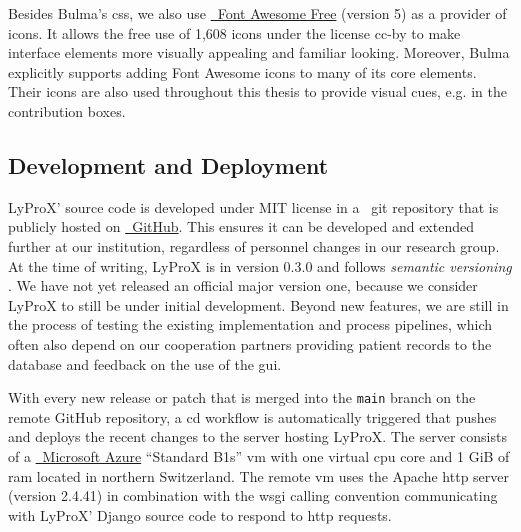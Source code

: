 \documentclass[\relativeRoot/main.tex]{subfiles}
\begin{document}
Besides Bulma's \gls{css}, we also use \href{https://fontawesome.com}{~Font Awesome Free} (version 5) \cite{noauthor_font_2022} as a provider of icons. It allows the free use of 1,608 icons under the license  \gls{cc-by} to make interface elements more visually appealing and familiar looking. Moreover, Bulma explicitly supports adding Font Awesome icons to many of its core elements. Their icons are also used throughout this thesis to provide visual cues, e.g. in the contribution boxes.

\subsection*{Development and Deployment}
\label{subsec:lyprox:implementation:develop_deploy}

LyProX' source code is developed under MIT license in a ~git \cite{torvalds_git_2022} repository that is publicly hosted on \href{https://github.com/rmnldwg/lyprox}{~GitHub}. This ensures it can be developed and extended further at our institution, regardless of personnel changes in our research group. At the time of writing, LyProX is in version 0.3.0 and follows \emph{semantic versioning} \cite{preston-werner_semantic_nodate}. We have not yet released an official major version one, because we consider LyProX to still be under initial development. Beyond new features, we are still in the process of testing the existing implementation and process pipelines, which often also depend on our cooperation partners providing patient records to the database and feedback on the use of the \gls{gui}.

With every new release or patch that is merged into the \texttt{main} branch on the remote GitHub repository, a \gls{cd} workflow is automatically triggered that pushes and deploys the recent changes to the server hosting LyProX. The server consists of a \href{https://azure.microsoft.com/}{~Microsoft Azure} ``Standard B1s'' \gls{vm} with one virtual \acrshort{cpu} core and 1 GiB of \acrshort{ram} located in northern Switzerland. The remote \gls{vm} uses the Apache \acrshort{http} server (version 2.4.41) \cite{mccool_apache_nodate} in combination with the \acrshort{wsgi} calling convention \cite{eby_python_2010} communicating with LyProX' Django source code to respond to \acrshort{http} requests.
\end{document}
